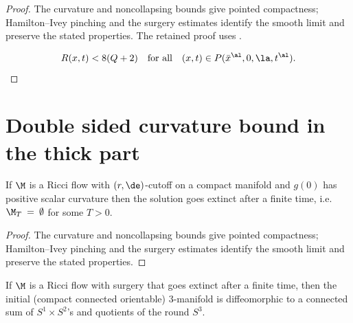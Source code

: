\begin{proof}
\sketch The curvature and noncollapsing bounds give pointed compactness; Hamilton--Ivey pinching and the surgery estimates identify the smooth limit and preserve the stated properties.
The retained proof uses \cite{Perelman2}.

\begin{equation}
\label{2q+1}
R(x,t)< 8(Q+2)\quad\mbox{for all}\quad (x,t)\in P(\bar x^\al,0,\la,t^\al).
\end{equation}
\end{proof}

\section{Double sided curvature bound in the thick part}
\label{II.6}

\begin{lemma}
  \label{lem:kl-double-sided-curvature-bound-thick-part-compactness-thick-thin-geometry}
 \label{pscempty}
If $\M$ is a Ricci flow with $(r,\de)$-cutoff on a compact manifold and
$g(0)$ has positive scalar curvature then the solution goes extinct
after a finite time, i.e. $\M_T \: = \: \emptyset$ for some $T > 0$.
\end{lemma}

\begin{proof}
\sketch The curvature and noncollapsing bounds give pointed compactness; Hamilton--Ivey pinching and the surgery estimates identify the smooth limit and preserve the stated properties.
\end{proof}

\begin{lemma}
  \label{lem:kl-double-sided-curvature-bound-thick-part-compactness-ricci-flow-surgery}
 \label{finitetime}
If $\M$ is a Ricci flow with surgery that goes extinct after a finite time,
then the initial (compact connected orientable) $3$-manifold is diffeomorphic to a
connected sum of $S^1 \times S^2$'s and quotients of the round
$S^3$.
\end{lemma}

